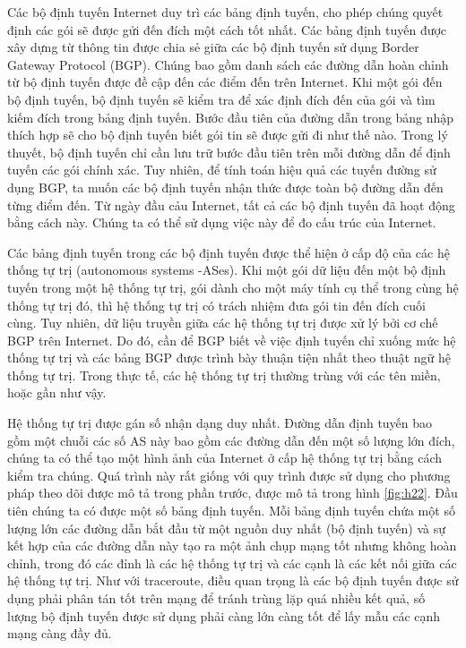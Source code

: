 Các bộ định tuyến Internet duy trì các bảng định tuyến, cho phép chúng quyết định các gói sẽ được gửi đến đích một cách tốt nhất. Các bảng định tuyến được xây dựng từ thông tin được chia sẻ giữa các bộ định tuyến sử dụng Border Gateway Protocol (BGP). Chúng bao gồm danh sách các đường dẫn hoàn chỉnh từ bộ định tuyến được đề cập đến các điểm đến trên Internet. Khi một gói đến bộ định tuyến, bộ định tuyến sẽ kiểm tra để xác định đích đến của gói và tìm kiếm đích trong bảng định tuyến. Bước đầu tiên của đường dẫn trong bảng nhập thích hợp sẽ cho bộ định tuyến biết gói tin sẽ được gửi đi như thế nào. Trong lý thuyết, bộ định tuyến chỉ cần lưu trữ bước đầu tiên trên mỗi đường dẫn để định tuyến các gói chính xác. Tuy nhiên, để tính toán hiệu quả các tuyến đường sử dụng BGP, ta muốn các bộ định tuyến nhận thức được toàn bộ đường dẫn đến từng điểm đến. Từ ngày đầu cảu Internet, tất cả các bộ định tuyến đã hoạt động bằng cách này. Chúng ta có thể sử dụng việc này để đo cấu trúc của Internet.\par
Các bảng định tuyến trong các bộ định tuyến được thể hiện ở cấp độ của các hệ thống tự trị (autonomous systems -ASes). Khi một gói dữ liệu đến một bộ định tuyến trong một hệ thống tự trị, gói dành cho một máy tính cụ thể trong cùng hệ thống tự trị đó, thì hệ thống tự trị có trách nhiệm đưa gói tin đến đích cuối cùng. Tuy nhiên, dữ liệu truyền giữa các hệ thống tự trị được xử lý bởi cơ chế BGP trên Internet. Do đó, cần để BGP biết về việc định tuyến chỉ xuống mức hệ thống tự trị và các bảng BGP được trình bày thuận tiện nhất theo thuật ngữ hệ thống tự trị. Trong thực tế, các hệ thống tự trị thường trùng với các tên miền, hoặc gần như vậy.\par
Hệ thống tự trị được gán số nhận dạng duy nhất. Đường dẫn định tuyến bao gồm một chuỗi các số AS này bao gồm các đường dẫn đến một số lượng lớn đích, chúng ta có thể tạo một hình ảnh của Internet ở cấp hệ thống tự trị bằng cách kiểm tra chúng. Quá trình này rất giống với quy trình được sử dụng cho phương pháp theo dõi được mô tả trong phần trước, được mô tả trong hình \ref{fig:h22}. Đầu tiên chúng ta có được một số bảng định tuyến. Mỗi bảng định tuyến chứa một số lượng lớn các đường dẫn bắt đầu từ một nguồn duy nhất (bộ định tuyến) và sự kết hợp của các đường dẫn này tạo ra một ảnh chụp mạng tốt nhưng không hoàn chỉnh, trong đó các đỉnh là các hệ thống tự trị và các cạnh là các kết nối giữa các hệ thống tự trị. Như với traceroute, điều quan trọng là các bộ định tuyến được sử dụng phải phân tán tốt trên mạng để tránh trùng lặp quá nhiều kết quả, số lượng bộ định tuyến được sử dụng phải càng lớn càng tốt để lấy mẫu các cạnh mạng càng đầy đủ.\par
